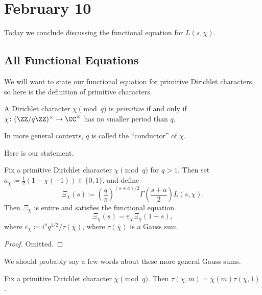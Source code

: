\documentclass[../notes.tex]{subfiles}
\begin{document}
\section{February 10}

Today we conclude discussing the functional equation for $L(s,\chi)$.

\subsection{All Functional Equations}
We will want to state our functional equation for primitive Dirichlet characters, so here is the definition of primitive characters.
\begin{definition}[primitive]
	A Dirichlet character $\chi\pmod q$ is \textit{primitive} if and only if $\chi\colon(\ZZ/q\ZZ)^\times\to\CC^\times$ has no smaller period than $q$.
\end{definition}
\begin{remark}
	In more general contexts, $q$ is called the ``conductor'' of $\chi$.
\end{remark}
Here is our statement.
\begin{theorem} \label{thm:l-chi-func-eq}
	Fix a primitive Dirichlet character $\chi\pmod q$ for $q>1$. Then set $a_\chi\coloneqq\frac12(1-\chi(-1))\in\{0,1\}$, and define
	\[\Xi_\chi(s)\coloneqq\left(\frac q\pi\right)^{(s+a)/2}\Gamma\left(\frac{s+a}2\right)L(s,\chi).\]
	Then $\Xi_\chi$ is entire and satisfies the functional equation
	\[\Xi_\chi(s)=\varepsilon_{\overline\chi}\Xi_{\overline\chi}(1-s),\]
	where $\varepsilon_\chi\coloneqq i^aq^{1/2}/\tau(\chi)$, where $\tau(\overline\chi)$ is a Gauss sum.
\end{theorem}
\begin{proof}
	Omitted.
\end{proof}
We should probably say a few words about these more general Gauss sums.
\begin{lemma}
	Fix a primitive Dirichlet character $\chi\pmod q$. Then $\tau(\chi,m)=\overline\chi(m)\tau(\chi,1)$.
\end{lemma}
\end{document}
